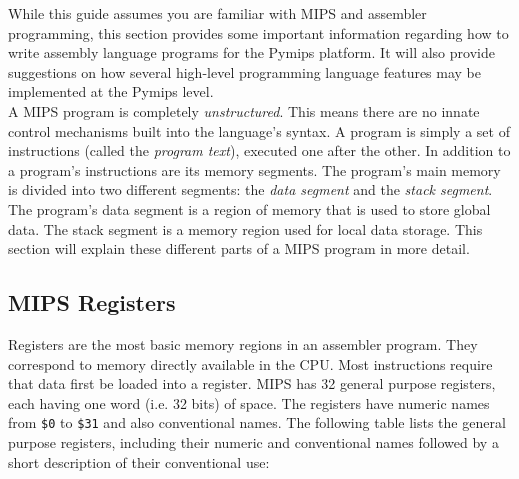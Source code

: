 \documentclass[12pt]{article}
\begin{document}
While this guide assumes you are familiar with MIPS and assembler programming,
     this section provides some important information regarding how to write
     assembly language programs for the Pymips platform. It will also provide
     suggestions on how several high-level programming language features may be
     implemented at the Pymips level.\\

A MIPS program is completely \textit{unstructured}. This means there are no
     innate control mechanisms built into the language's syntax. A program is
     simply a set of instructions (called the \textit{program text}), executed
     one after the other. In addition to a program's instructions are its memory
     segments. The program's main memory is divided into two different segments:
     the \textit{data segment} and the \textit{stack segment}. The program's
     data segment is a region of memory that is used to store global data. The
     stack segment is a memory region used for local data storage. This section
     will explain these different parts of a MIPS program in more detail.

\subsection{MIPS Registers}

Registers are the most basic memory regions in an assembler program. They
     correspond to memory directly available in the CPU. Most instructions
     require that data first be loaded into a register. MIPS has 32 general
     purpose registers, each having one word (i.e. 32 bits) of space. The
     registers have numeric names from \texttt{\$0} to \texttt{\$31} and also
     conventional names. The following table lists the general purpose
     registers, including their numeric and conventional names followed by a
     short description of their conventional use:\\
\end{document}
